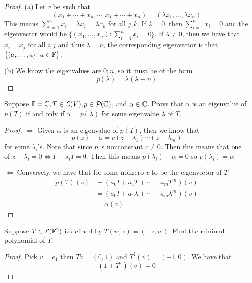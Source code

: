 \documentclass{extarticle}
\begin{document}
\begin{proof}
(a)  Let \(v\) be such that 
\[(x_1 + \cdots + x_n, \cdots, x_1 + \cdots + x_n) = (\lambda x_1, \ldots, \lambda x_n)\]
This means \(\sum_{i=1}^{n} x_i = \lambda x_j = \lambda x_k\) for all \(j, k\). If \(\lambda = 0\), then 
\(\sum_{i=1}^{n} x_i = 0\) and the eigenvector would be \(\{(x_1, \ldots, x_n) \colon \sum_{i=1}^{n}x_i = 0\}\). 
If \(\lambda \neq 0\), then we have that \(x_i = x_j\) for all \(i, j\) and thus \(\lambda = n\), the corresponding 
eigenvector is that \(\{(a, \ldots, a) \colon a \in \mathbb{F}\}\). 

(b) We know the eigenvalues are \(0; n\), so it must be of the form 
\[p(\lambda) = \lambda (\lambda - n)\]
\end{proof}

\begin{problem}{4}
    Suppose \(\mathbb{F} = \mathbb{C}, T \in \mathcal{L}(V), p \in \mathcal{P}(\mathbb{C})\), and \(\alpha \in \mathbb{C}\). Prove that \(\alpha\) is an 
    eigenvalue of \(p(T)\) if and only if \(\alpha = p(\lambda)\) for some eigenvalue \(\lambda\) of \(T\).
\end{problem}

\begin{proof}
\(\Rightarrow\) Given \(\alpha\) is an eigenvalue of \(p(T)\), then we know that  
\[p(z)  - \alpha = c(z - \lambda_1) \cdots (z - \lambda_m)\]
for some \(\lambda_i\)'s.  Note that since \(p\) is nonconstant \(c \neq 0\). Then this means that 
one of \(z - \lambda_i = 0 \Longleftrightarrow T - \lambda_i I = 0\). Then this means \(p(\lambda_i) - \alpha = 0\)
so \(p(\lambda_i) = \alpha\). 

\(\Leftarrow\) Conversely, we have that for some nonzero \(v\) to be the eigenvector of \(T\)
\begin{align*}
    p(T)(v) 
    &= (a_0 I + a_1 T + \cdots + a_m T^m)(v) \\ 
    &= (a_0I + a_1 \lambda + \cdots + a_m \lambda^m)(v) \\ 
    &= \alpha(v)
\end{align*}
\end{proof}

\begin{problem}{6}
    Suppose \(T \in \mathcal{L}(\mathbb{F}^2)\) is defined by \(T(w, z) = (-z, w)\). Find the minimal polynomial of \(T\).
\end{problem}

\begin{proof}
Pick \(v = e_1\) then \(Tv = (0, 1)\) and \(T^2(v) = (-1, 0)\). We have that  
\[(1 + T^2)(v) = 0\]
\end{proof}
\end{document}
